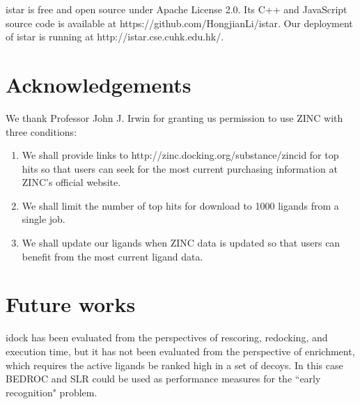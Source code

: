 istar is free and open source under Apache License 2.0. Its C++ and JavaScript source code is available at https://github.com/HongjianLi/istar. Our deployment of istar is running at http://istar.cse.cuhk.edu.hk/.

\section{Acknowledgements}

We thank Professor John J. Irwin for granting us permission to use ZINC \citep{532,1178} with three conditions:
\begin{enumerate}
\item We shall provide links to http://zinc.docking.org/substance/zincid for top hits so that users can seek for the most current purchasing information at ZINC's official website.
\item We shall limit the number of top hits for download to 1000 ligands from a single job.
\item We shall update our ligands when ZINC data is updated so that users can benefit from the most current ligand data.
\end{enumerate}

\section{Future works}

idock has been evaluated from the perspectives of rescoring, redocking, and execution time, but it has not been evaluated from the perspective of enrichment, which requires the active ligands be ranked high in a set of decoys. In this case BEDROC \citep{490} and SLR \citep{489} could be used as performance measures for the ``early recognition" problem.

\chapterend
